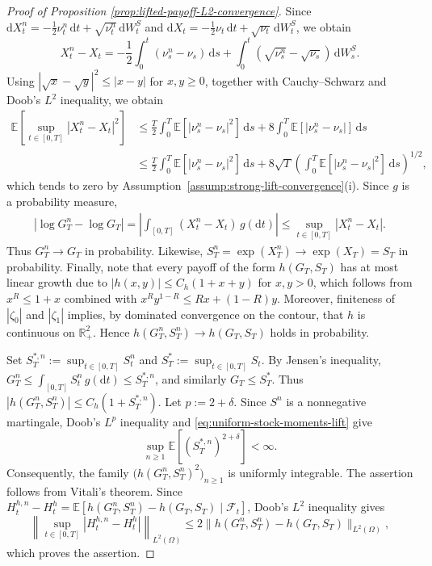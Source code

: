 \documentclass[10pt,a4paper,reqno]{amsart}
\theoremstyle{plain}
\theoremstyle{definition}
\theoremstyle{remark}
\theoremstyle{example}
\begin{document}
\begin{proof}[Proof of Proposition \ref{prop:lifted-payoff-L2-convergence}]
Since $\mathrm dX_t^n = -\frac12\nu_t^n\,\mathrm dt + \sqrt{\nu_t^n}\,\mathrm dW_t^S$ and $\mathrm dX_t = -\frac12\nu_t\,\mathrm dt + \sqrt{\nu_t}\,\mathrm dW_t^S$, we obtain
\[
    X_t^n-X_t = -\frac12 \int_0^t (\nu_s^n-\nu_s)\,\mathrm ds + \int_0^t (\sqrt{\nu_s^n}-\sqrt{\nu_s})\, \mathrm dW_s^S.
\]
Using $|\sqrt{x}-\sqrt{y}|^2 \leq |x-y|$ for $x,y \geq 0$, together with Cauchy--Schwarz and Doob's $L^2$ inequality, we obtain 
\begin{align*}
    \mathbb E\left[ \sup_{t\in[0,T]} |X_t^n-X_t|^2 \right]
    &\leq \frac{T}{2} \int_0^T \mathbb E[ |\nu_s^n-\nu_s|^2 ]\,\mathrm ds + 8 \int_0^T \mathbb E[ |\nu_s^n-\nu_s| ]\,\mathrm ds
    \\ &\leq \frac{T}{2} \int_0^T \mathbb E[ |\nu_s^n-\nu_s|^2 ]\,\mathrm ds
    + 8\sqrt{T} \left( \int_0^T\mathbb E[ |\nu_s^n-\nu_s|^2 ]\,\mathrm ds \right)^{1/2},
\end{align*}
which tends to zero by Assumption~\ref{assump:strong-lift-convergence}(i). Since $g$ is a probability measure,
\begin{align*}
    \left| \log G_T^n-\log G_T \right| = \left| \int_{[0,T]} (X_t^n-X_t)\, g(\mathrm dt) \right|
    \leq \sup_{t\in[0,T]} |X_t^n-X_t|.
\end{align*}
Thus $G_T^n \longrightarrow G_T$ in probability. Likewise, $S_T^n=\exp(X_T^n) \longrightarrow \exp(X_T)=S_T$ in probability. Finally, note that every payoff of the form $h(G_T, S_T)$ has at most linear growth due to $|h(x,y)| \leq C_h(1+x+y)$ for $x,y>0$, which follows from $x^R \leq 1 + x$ combined with $x^R y^{1-R} \leq R x + (1-R)y$. Moreover, finiteness of $|\zeta_0|$ and $|\zeta_1|$ implies, by dominated convergence on the contour, that $h$ is continuous on $\mathbb R_+^2$. Hence $h(G_T^n,S_T^n) \longrightarrow h(G_T,S_T)$ holds in probability. 

Set $S_T^{*,n} := \sup_{t\in[0,T]}S_t^n$ and $S_T^* := \sup_{t\in[0,T]}S_t$. By Jensen's inequality, $G_T^n \leq \int_{[0,T]}S_t^n\,g(\mathrm dt) \leq S_T^{*,n}$, and similarly $G_T\leq S_T^*$. Thus $|h(G_T^n, S_T^n)| \leq C_h(1+S_T^{*,n})$. Let $p:=2+\delta$. Since $S^n$ is a nonnegative martingale, Doob's $L^p$ inequality and \eqref{eq:uniform-stock-moments-lift} give
\[
    \sup_{n\geq1} \mathbb E[ (S_T^{*,n})^{2+\delta}] <\infty.
\]
Consequently, the family $\bigl( h(G_T^n, S_T^n)^2 \bigr)_{n\geq1}$ is uniformly integrable. The assertion follows from Vitali's theorem. Since $H_t^{h,n}-H_t^h = \mathbb E[ h(G_T^n, S_T^n) - h(G_T, S_T) \mid\mathcal F_t ]$, Doob's $L^2$ inequality gives
\[
    \left\| \sup_{t\in[0,T]} |H_t^{h,n}-H_t^h| \right\|_{L^2(\Omega)} \leq 2 \|h(G_T^n, S_T^n) - h(G_T, S_T)\|_{L^2(\Omega)},
\]
which proves the assertion.
\end{proof}
\end{document}
